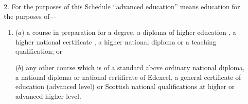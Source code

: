 \documentclass[a4paper,12pt]{article}
\begin{document}
%
%

2.  For the purposes of 
this Schedule  %
“advanced education” means education for the purposes of—
\begin{enumerate}\item[]
($a$) a course in preparation for a degree, a diploma of higher education%
, a higher national certificate%
, a higher national diploma or a teaching qualification; or

($b$) any other course which is of a standard above ordinary national diploma, a national diploma or national certificate of Edexcel, a general certificate of education (advanced level) or Scottish national qualifications at higher or advanced higher level.
\end{enumerate}

\end{document}
